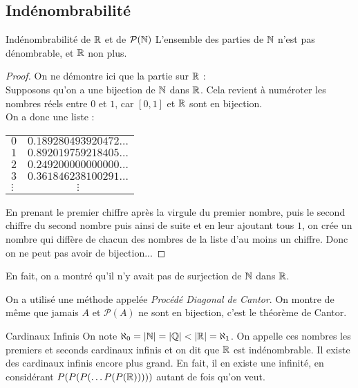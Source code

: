 \documentclass{cours}
\begin{document}
    \subsection{Indénombrabilité}
    \begin{théorème}{Indénombrabilité de $\mathbb{R}$ et de $\mathcal{P}(\mathbb{N})$}{}
        L'ensemble des parties de $\mathbb{N}$ n'est pas dénombrable, et $\mathbb{R}$ non plus.
    \end{théorème}
    \begin{proof}
        On ne démontre ici que la partie sur $\mathbb{R}$ : \\
        Supposons qu'on a une bijection de $\mathbb{N}$ dans $\mathbb{R}$. Cela revient à numéroter les nombres réels entre $0$ et $1$, car $\left[0, 1\right]$ et $\mathbb{R}$ sont en bijection.\\
        On a donc une liste :
        \begin{center}
            \begin{tabular}{lc}
                $0$ & $0.189280493920472\ldots$\\
                $1$ & $0.892019759218405\ldots$\\
                $2$ & $0.249200000000000\ldots$\\
                $3$ & $0.361846238100291\ldots$\\
                $\vdots$ & $\vdots$
            \end{tabular}
        \end{center}
        En prenant le premier chiffre après la virgule du premier nombre, puis le second chiffre du second nombre puis ainsi de suite et en leur ajoutant tous $1$, on crée un nombre qui diffère de chacun des nombres de la liste d'au moins un chiffre. Donc on ne peut pas avoir de bijection... 
    \end{proof}

    \begin{remarque}{}{}
        En fait, on a montré qu'il n'y avait pas de surjection de $\mathbb{N}$ dans $\mathbb{R}$.
    \end{remarque}
    
    \begin{remarque}{}{}
        On a utilisé une méthode appelée \emph{Procédé Diagonal de Cantor}. On montre de même que jamais $A$ et $\mathcal{P}(A)$ ne sont en bijection, c'est le théorème de Cantor.
    \end{remarque}

    \begin{définition}{Cardinaux Infinis}{}
        On note $\aleph_{0} = \left|\mathbb{N}\right| = \left|\mathbb{Q}\right| < \left|\mathbb{R}\right| = \aleph_{1}$. On appelle ces nombres les premiers et seconds cardinaux infinis et on dit que $\mathbb{R}$ est indénombrable. Il existe des cardinaux infinis encore plus grand. En fait, il en existe une infinité, en considérant $P(P(P(\ldots P(P(\mathbb{R})))))$ autant de fois qu'on veut.
    \end{définition}
\end{document}
